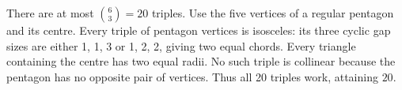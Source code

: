 There are at most $\binom63=20 $ triples. Use the five vertices of a regular pentagon and its centre. Every triple of pentagon vertices is isosceles: its three cyclic gap sizes are either 1, 1, 3 or 1, 2, 2, giving two equal chords. Every triangle containing the centre has two equal radii. No such triple is collinear because the pentagon has no opposite pair of vertices. Thus all 20 triples work, attaining $\boxed{20}$. 

